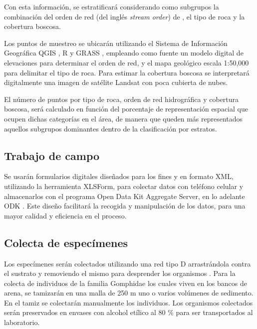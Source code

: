 \documentclass[12pt,letterpaper,spanish]{article}
\begin{document}
Con esta información, se estratificará considerando como subgrupos la combinación del orden de red (del inglés \textit{stream order}) de \citet{strahler1952hypsometric}, el tipo de roca y la cobertura boscosa. 

Los puntos de muestreo se ubicarán utilizando el Sistema de Información Geográfica QGIS \citep{qgis2018qgis}, R \citep{team2015r} y GRASS \citep{neteler2013open}, empleando como fuente un modelo digital de elevaciones para determinar el orden de red, y el mapa geológico escala 1:50,000 \citep{servicio2000mapageol} para delimitar el tipo de roca. Para estimar la cobertura boscosa se interpretará digitalmente una imagen de satélite Landsat \citep{nasa2014srtm1sdem} con poca cubierta de nubes.

El número de puntos por tipo de roca, orden de red hidrográfica y cobertura boscosa, será calculado en función del porcentaje de representación espacial que ocupen dichas categorías en el área, de manera que queden más representados aquellos subgrupos dominantes dentro de la clasificación por estratos.

\subsection{Trabajo de campo}

Se usarán formularios digitales diseñados para los fines y en formato XML, utilizando la herramienta XLSForm, para colectar datos con teléfono celular y almacenarlos con el programa Open Data Kit Aggregate Server, en lo adelante ODK \citep{hartung2010open}. Este diseño facilitará la recogida y manipulación de los datos, para una mayor calidad y eficiencia en el proceso.

\subsection{Colecta de especímenes}

Los especímenes serán colectados utilizando una red tipo D arrastrándola contra el sustrato y removiendo el mismo para desprender los organismos \citep{ramirez2010capitulo}. Para la colecta de individuos de la familia Gomphidae los cuales viven en los bancos de arena, se tamizarán en una malla de 250 \textmu m  \citep{mandal2008biocontrol, torralba2009estado} uno o varios volúmenes de sedimento. En el tamiz se colectarán manualmente los individuos. Los organismos colectados serán preservados en envases con alcohol etílico al 80 \% para ser transportados al laboratorio.
\end{document}
